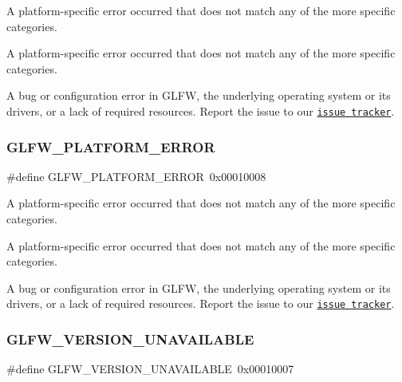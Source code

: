 A platform-\/specific error occurred that does not match any of the more specific categories. 

A platform-\/specific error occurred that does not match any of the more specific categories.

A bug or configuration error in G\+L\+FW, the underlying operating system or its drivers, or a lack of required resources. Report the issue to our \href{https://github.com/glfw/glfw/issues}{\tt issue tracker}. \mbox{\label{group__errors_gad44162d78100ea5e87cdd38426b8c7a1}} 
\subsubsection{\texorpdfstring{G\+L\+F\+W\+\_\+\+P\+L\+A\+T\+F\+O\+R\+M\+\_\+\+E\+R\+R\+OR}{GLFW\_PLATFORM\_ERROR}\hspace{0.1cm}{\footnotesize\ttfamily [5/5]}}
{\footnotesize\ttfamily \#define G\+L\+F\+W\+\_\+\+P\+L\+A\+T\+F\+O\+R\+M\+\_\+\+E\+R\+R\+OR~0x00010008}



A platform-\/specific error occurred that does not match any of the more specific categories. 

A platform-\/specific error occurred that does not match any of the more specific categories.

A bug or configuration error in G\+L\+FW, the underlying operating system or its drivers, or a lack of required resources. Report the issue to our \href{https://github.com/glfw/glfw/issues}{\tt issue tracker}. \mbox{\label{group__errors_gad16c5565b4a69f9c2a9ac2c0dbc89462}} 
\subsubsection{\texorpdfstring{G\+L\+F\+W\+\_\+\+V\+E\+R\+S\+I\+O\+N\+\_\+\+U\+N\+A\+V\+A\+I\+L\+A\+B\+LE}{GLFW\_VERSION\_UNAVAILABLE}\hspace{0.1cm}{\footnotesize\ttfamily [1/5]}}
{\footnotesize\ttfamily \#define G\+L\+F\+W\+\_\+\+V\+E\+R\+S\+I\+O\+N\+\_\+\+U\+N\+A\+V\+A\+I\+L\+A\+B\+LE~0x00010007}



